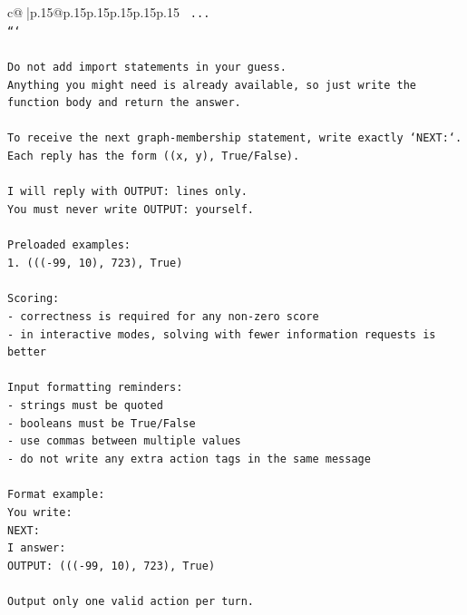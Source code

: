 \documentclass{article}
\begin{document}
{\begin{supertabular}{c@{$\;$}|p{.15\linewidth}@{}p{.15\linewidth}p{.15\linewidth}p{.15\linewidth}p{.15\linewidth}p{.15\linewidth}}
{{{\texttt{    ...} \\
\texttt{```} \\
\\ 
\texttt{Do not add import statements in your guess.} \\
\texttt{Anything you might need is already available, so just write the function body and return the answer.} \\
\\ 
\texttt{To receive the next graph{-}membership statement, write exactly `NEXT:`.} \\
\texttt{Each reply has the form ((x, y), True/False).} \\
\\ 
\texttt{I will reply with OUTPUT: lines only.} \\
\texttt{You must never write OUTPUT: yourself.} \\
\\ 
\texttt{Preloaded examples:} \\
\texttt{1. ((({-}99, 10), 723), True)} \\
\\ 
\texttt{Scoring:} \\
\texttt{{-} correctness is required for any non{-}zero score} \\
\texttt{{-} in interactive modes, solving with fewer information requests is better} \\
\\ 
\texttt{Input formatting reminders:} \\
\texttt{{-} strings must be quoted} \\
\texttt{{-} booleans must be True/False} \\
\texttt{{-} use commas between multiple values} \\
\texttt{{-} do not write any extra action tags in the same message} \\
\\ 
\texttt{Format example:} \\
\texttt{You write:} \\
\texttt{NEXT:} \\
\texttt{I answer:} \\
\texttt{OUTPUT: ((({-}99, 10), 723), True)} \\
\\ 
\texttt{Output only one valid action per turn.} \\
            }
        }
    }
     \\ \\


\end{supertabular}}
\end{document}
